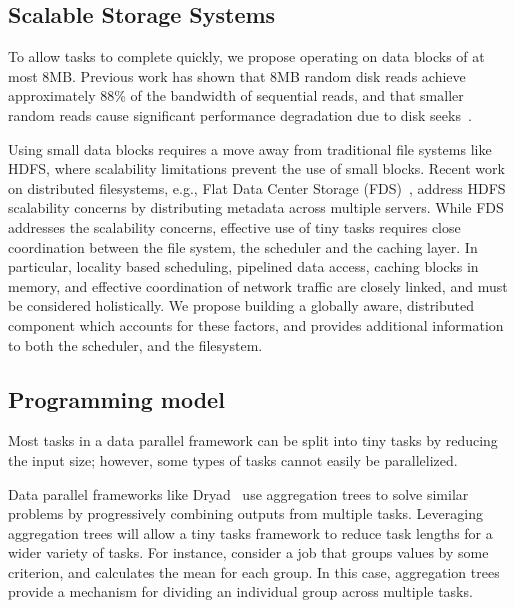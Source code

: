 \subsection{Scalable Storage Systems}
To allow tasks to complete quickly, we propose operating on data blocks of
at most $8$MB. Previous work has shown that $8$MB random disk reads achieve
approximately $88$\% of the bandwidth of sequential reads, and that smaller random
reads cause significant performance degradation due to disk
seeks~\cite{nightingale2012flat}. 

Using small data blocks requires a move away from traditional file systems like
HDFS, where scalability limitations prevent the use of small blocks.
Recent work on distributed filesystems, e.g., Flat Data Center
Storage (FDS)~\cite{nightingale2012flat}, address HDFS scalability concerns by
distributing metadata across multiple servers. While FDS addresses the scalability
concerns, effective use of tiny tasks requires close coordination between the file
system, the scheduler and the caching layer.
In particular, locality based scheduling, pipelined data access, caching blocks in 
memory, and effective coordination of network traffic are closely linked, and 
must be considered holistically. We propose building a globally aware, distributed
component which accounts for these factors, and provides additional information to
both the scheduler, and the filesystem.

\subsection{Programming model}
\label{sec:prog}
Most tasks in a data parallel framework can be split into tiny tasks by
reducing the input size; however, some types of tasks cannot easily be
parallelized.

Data parallel frameworks like Dryad~\cite{yu2008dryadlinq} use aggregation
trees to solve similar problems by progressively combining outputs from
multiple tasks. Leveraging aggregation trees will allow a tiny tasks framework
to reduce task lengths for a wider variety of tasks. For instance, consider a
job that groups values by some criterion, and calculates the mean for each group.
In this case, aggregation trees provide a mechanism for dividing an individual group
across multiple tasks.


